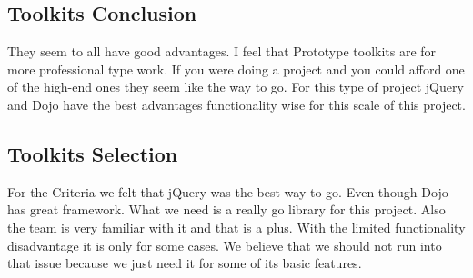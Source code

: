 \documentclass[10pt,draftclsnofoot,onecolumn]{IEEEtran}
\newcommand*{\SignatureAndDate}[1]{
	\vspace{1in}
	\par\noindent\makebox[2.5in]{\hrulefill} \hspace{.5in} \makebox[2.0in]{\hrulefill}
	\par\noindent\makebox[2.5in][l]{#1}      \hspace{.5in} \makebox[2.0in][l]{Date}
}
\begin{document}
    \subsection{Toolkits Conclusion}
     They seem to all have good advantages.  I feel that Prototype toolkits are for more professional type work.  If you were doing a project and you could afford one of the high-end ones they seem like the way to go.  For this type of project jQuery and Dojo have the best advantages functionality wise for this scale of this project.  
     \subsection{Toolkits Selection}
      For the Criteria we felt that jQuery was the best way to go. Even though Dojo has great framework.  What we need is a really go library for this project.  Also the team is very familiar with it and that is a plus.  With the limited functionality disadvantage it is only for some cases.  We believe that we should not run into that issue because we just need it for some of its basic features.
	\printindex






\end{document}
